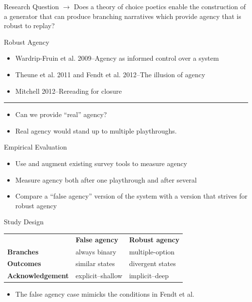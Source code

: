 \documentclass[xcolor=x11names]{beamer}
\begin{document}
\begin{frame}{Research Question}
  \color{black} $\rightarrow$ Does a theory of choice poetics enable the construction of a generator that can produce branching narratives which provide agency that is robust to replay?
\end{frame}

\begin{frame}{Robust Agency}
  \begin{itemize}
    \item Wardrip-Fruin et al. 2009--Agency as informed control over a system
    \item Theune et al. 2011 and Fendt et al. 2012--The illusion of agency
    \item Mitchell 2012--Rereading for closure
  \end{itemize}
  \hrule
  \begin{itemize}
    \item Can we provide ``real'' agency?
    \item Real agency would stand up to multiple playthroughs.
  \end{itemize}
\end{frame}

\begin{frame}{Empirical Evaluation}
  \begin{itemize}
    \item Use and augment existing survey tools to measure agency
    \item Measure agency both after one playthrough and after several
    \item Compare a ``false agency'' version of the system with a version that strives for robust agency
  \end{itemize}
\end{frame}

\begin{frame}{Study Design}
  \begin{tabular}{C{0.3\textwidth} C{0.35\textwidth} C{0.35\textwidth}}
    & \textbf{False agency} & \textbf{Robust agency} \\
    \textbf{Branches} & always binary & multiple-option \\
    \textbf{Outcomes} & similar states & divergent states \\
    \textbf{Acknowledgement} & explicit--shallow & implicit--deep \\
  \end{tabular}
  \vspace{2em}
  \begin{itemize}
    \item The false agency case mimicks the conditions in Fendt et al.
  \end{itemize}
\end{frame}
\end{document}
